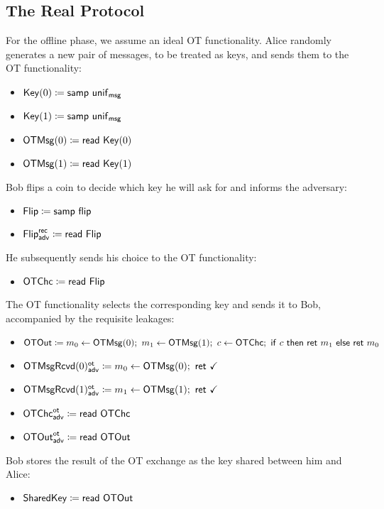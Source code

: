 \subsection{The Real Protocol}
For the offline phase, we assume an ideal OT functionality. Alice randomly generates a new pair of messages, to be treated as keys, and sends them to the OT functionality:
\begin{itemize}
\item $\mathsf{Key}(0) \coloneqq \mathsf{samp} \ \mathsf{unif}_{\mathsf{msg}}$
\item $\mathsf{Key}(1) \coloneqq \mathsf{samp} \ \mathsf{unif}_{\mathsf{msg}}$
\item $\mathsf{OTMsg}(0) \coloneqq \mathsf{read} \ \mathsf{Key}(0)$
\item $\mathsf{OTMsg}(1) \coloneqq \mathsf{read} \ \mathsf{Key}(1)$
\end{itemize}
Bob flips a coin to decide which key he will ask for and informs the adversary:
\begin{itemize}
\item $\mathsf{Flip} \coloneqq \mathsf{samp} \ \mathsf{flip}$
\item {\color{blue} $\mathsf{Flip}^{\mathsf{rec}}_{\mathsf{adv}} \coloneqq \mathsf{read} \ \mathsf{Flip}$}
\end{itemize}
He subsequently sends his choice to the OT functionality:
\begin{itemize}
\item $\mathsf{OTChc} \coloneqq \mathsf{read} \ \mathsf{Flip}$
\end{itemize}
The OT functionality selects the corresponding key and sends it to Bob, accompanied by the requisite leakages:
\begin{itemize}
\item $\OTOut \coloneqq m_0 \leftarrow \OTMsg(0); \ m_1 \leftarrow \OTMsg(1); \ c \leftarrow \OTChc; \ \ifte{c}{\ret{m_1}}{\ret{m_0}}$
\item {\color{blue} $\LeakOTMsgRcvd(0)^\ot_\adv \coloneqq m_0 \leftarrow \OTMsg(0); \ \ret{\checkmark}$}
\item {\color{blue} $\LeakOTMsgRcvd(1)^\ot_\adv \coloneqq m_1 \leftarrow \OTMsg(1); \ \ret{\checkmark}$}
\item {\color{blue} $\mathsf{OTChc}^{\mathsf{ot}}_{\mathsf{adv}} \coloneqq \mathsf{read} \ \mathsf{OTChc}$}
\item {\color{blue} $\mathsf{OTOut}^{\mathsf{ot}}_{\mathsf{adv}} \coloneqq \mathsf{read} \ \mathsf{OTOut}$}
\end{itemize}
Bob stores the result of the OT exchange as the key shared between him and Alice:
\begin{itemize}
\item $\mathsf{SharedKey} \coloneqq \mathsf{read} \ \mathsf{OTOut}$
\end{itemize}
